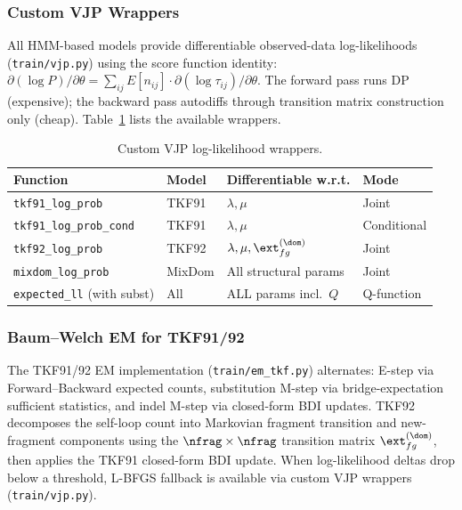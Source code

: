 \subsubsection{Custom VJP Wrappers}
All HMM-based models provide differentiable observed-data log-likelihoods
(\texttt{train/vjp.py}) using the score function identity:
$\partial(\log P)/\partial\theta = \sum_{ij} E[n_{ij}] \cdot \partial(\log \tau_{ij})/\partial\theta$.
The forward pass runs DP (expensive); the backward pass autodiffs
through transition matrix construction only (cheap).
Table~\ref{tab:impl-vjp} lists the available wrappers.

\begin{table}[htbp]
\centering\small
\caption{Custom VJP log-likelihood wrappers.}
\label{tab:impl-vjp}
\begin{tabular}{@{}llll@{}}
\toprule
\textbf{Function} & \textbf{Model} & \textbf{Differentiable w.r.t.} & \textbf{Mode} \\
\midrule
\texttt{tkf91\_log\_prob} & TKF91 & $\lambda, \mu$ & Joint \\
\texttt{tkf91\_log\_prob\_cond} & TKF91 & $\lambda, \mu$ & Conditional \\
\texttt{tkf92\_log\_prob} & TKF92 & $\lambda, \mu, \ext^{(\dom)}_{fg}$ & Joint \\
\texttt{mixdom\_log\_prob} & MixDom & All structural params & Joint \\
\texttt{expected\_ll} (with subst) & All & ALL params incl.\ $Q$ & Q-function \\
\bottomrule
\end{tabular}
\end{table}

\subsubsection{Baum--Welch EM for TKF91/92}
The TKF91/92 EM implementation (\texttt{train/em\_tkf.py}) alternates:
E-step via Forward--Backward expected counts,
substitution M-step via bridge-expectation sufficient statistics,
and indel M-step via closed-form BDI updates.
TKF92 decomposes the self-loop count into Markovian fragment transition
and new-fragment components using the $\nfrag \times \nfrag$ transition matrix
$\ext^{(\dom)}_{fg}$, then applies the TKF91 closed-form BDI update.
When log-likelihood deltas drop below a threshold,
L-BFGS fallback is available via custom VJP wrappers (\texttt{train/vjp.py}).

